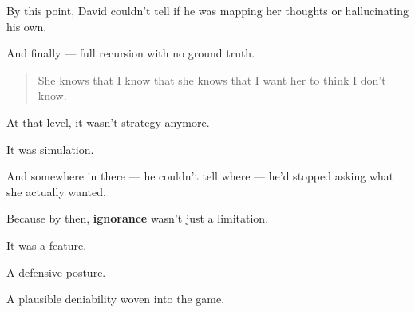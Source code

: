 By this point, David couldn’t tell if he was mapping her thoughts or hallucinating his own.

And finally — full recursion with no ground truth.

\begin{quote}
She knows that I know that she knows that I want her to think I don’t know.
\end{quote}

At that level, it wasn’t strategy anymore.

It was simulation.

And somewhere in there — he couldn’t tell where — he’d stopped asking what she actually wanted.

Because by then, \textbf{ignorance} wasn’t just a limitation.

It was a feature.

A defensive posture.

A plausible deniability woven into the game.

\medskip

